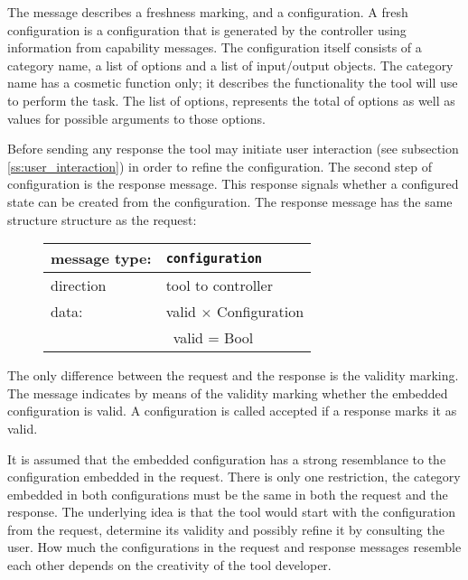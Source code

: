 \documentclass{article}
\newcommand{\msg}[1]{\texttt{#1}}
\begin{document}
   \noindent The message describes a freshness marking, and a configuration. A
   fresh configuration is a configuration that is generated by the controller
   using information from capability messages. The configuration itself
   consists of a category name, a list of options and a list of input/output
   objects. The category name has a cosmetic function only; it describes the
   functionality the tool will use to perform the task. The list of options,
   represents the total of options as well as values for possible arguments to
   those options.

   Before sending any response the tool may initiate user interaction (see
   subsection \ref{ss:user_interaction}) in order to refine the configuration.
   The second step of configuration is the response message. This response
   signals whether a configured state can be created from the configuration.
   The response message has the same structure structure as the request:

   \begin{figure}[H]
    \begin{center}
     \begin{tabular}{|ll|}
      \hline
       message type:   & \msg{configuration} \\
      \hline
       direction       & tool to controller \\
       data:           & valid $\times$ Configuration \\
                       & \ valid = Bool \\
      \hline
     \end{tabular}
    \end{center}
   \end{figure}

   \noindent The only difference between the request and the response is
   the validity marking. The message indicates by means of the validity marking
   whether the embedded configuration is valid. A configuration is called
   accepted if a response marks it as valid.

   It is assumed that the embedded configuration has a strong resemblance to
   the configuration embedded in the request. There is only one restriction,
   the category embedded in both configurations must be the same in both the
   request and the response. The underlying idea is that the tool would start
   with the configuration from the request, determine its validity and possibly
   refine it by consulting the user. How much the configurations in the request
   and response messages resemble each other depends on the creativity of the
   tool developer.
\end{document}
